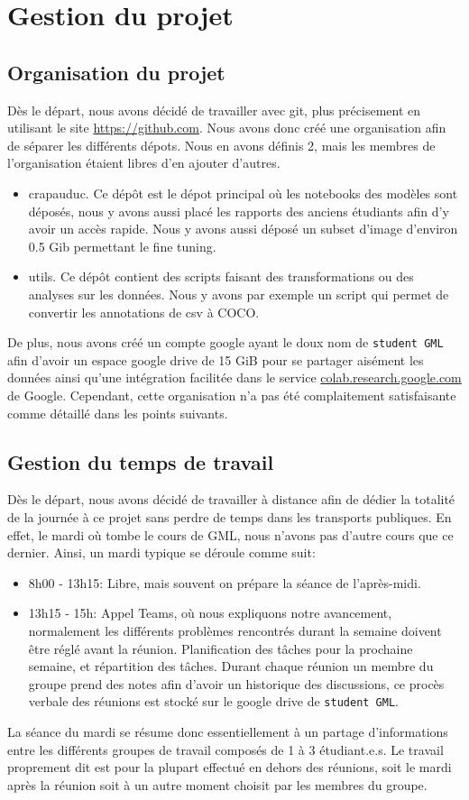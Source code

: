 \chapter{Gestion du projet}
\section{Organisation du projet}
Dès le départ, nous avons décidé de travailler avec git, plus précisement 
en utilisant le site \url{https://github.com}. Nous avons donc créé une organisation afin de séparer les différents dépots. Nous en avons définis 2, mais les membres de l'organisation étaient libres d'en ajouter d'autres.
\begin{itemize}
    \item crapauduc. Ce dépôt est le dépot principal où les notebooks des modèles sont déposés, nous y avons aussi placé les rapports des anciens étudiants afin d'y avoir un accès rapide. Nous y avons aussi déposé un subset d'image d'environ 0.5 Gib permettant le fine tuning.
    \item utils. Ce dépôt contient des scripts faisant des transformations ou des analyses sur les données. Nous y avons par exemple un script qui permet de convertir les annotations de csv à COCO.
\end{itemize}

De plus, nous avons créé un compte google ayant le doux nom de \verb|student GML| afin d'avoir un espace google drive de 15 GiB pour se partager aisément les données ainsi qu'une intégration facilitée dans le service \url{colab.research.google.com} de Google. Cependant, cette organisation n'a pas été complaitement satisfaisante comme détaillé dans les points suivants.


\section{Gestion du temps de travail}
Dès le départ, nous avons décidé de travailler à distance afin de dédier 
la totalité de la journée à ce projet sans perdre de temps dans les transports publiques. En effet, le mardi où tombe le cours de GML, nous n'avons pas d'autre cours que ce dernier. Ainsi, un mardi typique se déroule comme suit:
\begin{itemize}
    \item 8h00 - 13h15: Libre, mais souvent on prépare la séance de l'après-midi.
    \item 13h15 - 15h: Appel Teams, où nous expliquons notre avancement, normalement les différents problèmes rencontrés durant la semaine doivent être réglé avant la réunion. Planification des tâches pour la prochaine semaine, et répartition des tâches. Durant chaque réunion un membre du groupe prend des notes afin d'avoir un historique des discussions, ce procès verbale des réunions est stocké sur le google drive de \verb|student GML|.
    \label{item:seance}
\end{itemize}
La séance du mardi se résume donc essentiellement à un partage d'informations entre les différents groupes de travail composés de 1 à 3 étudiant.e.s. Le travail proprement dit est pour la plupart effectué en dehors des réunions, soit le mardi après la réunion soit à un autre moment choisit par les membres du groupe.

